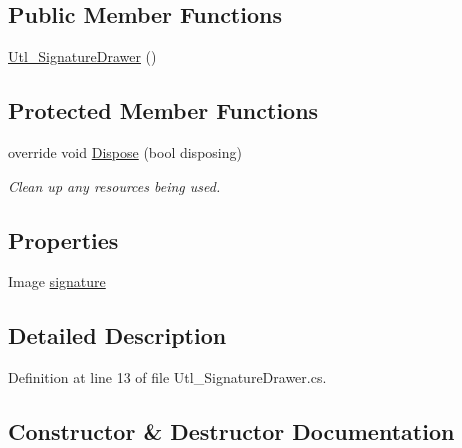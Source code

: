 \subsection*{Public Member Functions}
\begin{DoxyCompactItemize}
\item 
\hyperlink{classprj_progra_i_i_i_1_1_util_1_1_utl___signature_drawer_a6cb8f4b8ebff26bc7ce3cdf2a5ff489b}{Utl\+\_\+\+Signature\+Drawer} ()
\end{DoxyCompactItemize}
\subsection*{Protected Member Functions}
\begin{DoxyCompactItemize}
\item 
override void \hyperlink{classprj_progra_i_i_i_1_1_util_1_1_utl___signature_drawer_ab856654631111ac4fb38eb6053a48a4f}{Dispose} (bool disposing)
\begin{DoxyCompactList}\small\item\em Clean up any resources being used. \end{DoxyCompactList}\end{DoxyCompactItemize}
\subsection*{Properties}
\begin{DoxyCompactItemize}
\item 
Image \hyperlink{classprj_progra_i_i_i_1_1_util_1_1_utl___signature_drawer_aceabe33b7a11ca45bb78ad01479aa053}{signature}
\end{DoxyCompactItemize}


\subsection{Detailed Description}


Definition at line 13 of file Utl\+\_\+\+Signature\+Drawer.\+cs.



\subsection{Constructor \& Destructor Documentation}
\hypertarget{classprj_progra_i_i_i_1_1_util_1_1_utl___signature_drawer_a6cb8f4b8ebff26bc7ce3cdf2a5ff489b}{}\label{classprj_progra_i_i_i_1_1_util_1_1_utl___signature_drawer_a6cb8f4b8ebff26bc7ce3cdf2a5ff489b} 
